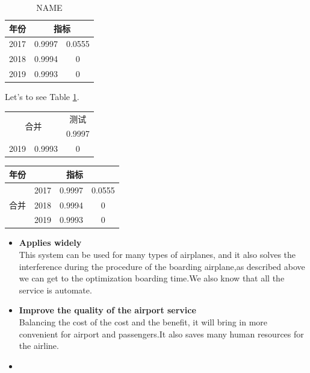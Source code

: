 \documentclass{mcmthesis}
\begin{document}
\begin{enumerate}
\begin{table}[h]
  \centering
  \begin{tabular}{c|cc}
\hline
年份 & \multicolumn{2}{c}{指标}\\
\hline
2017 & 0.9997 & 0.0555 \\
2018 & 0.9994 & 0      \\
2019 & 0.9993 & 0      \\
\hline
\end{tabular}
  \caption{NAME}\label{SIGN}
\end{table}

Let's to see Table \ref{SIGN}.


\begin{minipage}{0.5\linewidth}
\begin{tabular}{|c|c|c|}
\hline
\multicolumn{2}{|c|}{\multirow{2}{*}{合并}}&测试\\
\cline{3-3}
\multicolumn{2}{|c|}{}& 0.9997  \\
\hline
2019 & 0.9993 & 0 \\
\hline
\end{tabular}
\end{minipage}
\begin{minipage}{0.5\linewidth}
\begin{tabular}{c|ccc}
\hline
年份 & \multicolumn{3}{c}{指标}\\
\hline
\multirow{3}{*}{合并}&2017 & 0.9997 & 0.0555 \\
&2018 & 0.9994 & 0      \\
&2019 & 0.9993 & 0      \\
\hline
\end{tabular}
\end{minipage}






\begin{itemize}
\item \textbf{Applies widely}\\
This  system can be used for many types of airplanes, and it also
solves the interference during  the procedure of the boarding
airplane,as described above we can get to the  optimization
boarding time.We also know that all the service is automate.
\item \textbf{Improve the quality of the airport service}\\
Balancing the cost of the cost and the benefit, it will bring in
more convenient  for airport and passengers.It also saves many
human resources for the airline. \item \textbf{}
\end{itemize}


\end{enumerate}
\end{document}
